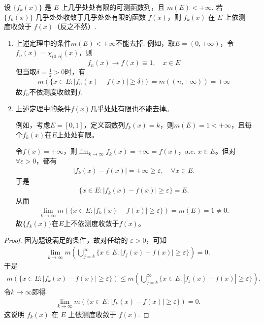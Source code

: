 \documentclass[../../main.tex]{subfiles}%
\begin{document}
\begin{theorem}[Lebesgue定理]\label{theorem:几乎处处收敛在E的测度有限前提下必依测度收敛}
设 $\{f_k(x)\}$ 是 $E$ 上几乎处处有限的可测函数列，且 $m(E)<+\infty$. 若 $\{f_k(x)\}$ 几乎处处收敛于几乎处处有限的函数 $f(x)$，则 $f_k(x)$ 在 $E$ 上依测度收敛于 $f(x)$（反之不然）.
\end{theorem}
\begin{remark}
\begin{enumerate}
\item 上述定理中的条件\(m(E) < +\infty\)不能去掉. 例如，取\(E = (0, +\infty)\)，令\(f_n(x) = \chi_{(0,n]}(x)\)，则
\[f_n(x) \to f(x) \equiv 1, \quad x \in E\]
但当取\(\delta = \frac{1}{2} > 0\)时，有
\begin{align*}
m(\{x \in E : |f_n(x) - f(x)| \geqslant \delta\}) = m((n, +\infty)) = +\infty
\end{align*}
故\(f_n\)不依测度收敛到\(f\). 

\item 上述定理中的条件\(f(x)\)几乎处处有限也不能去掉。

例如，考虑\(E = [0, 1]\)，定义函数列\(f_k(x) = k\)，则\(m(E) = 1 < +\infty\)，且每个\(f_k(x)\)在\(E\)上处处有限。

令\(f(x) = +\infty\)，则\(\lim_{k \to \infty} f_k(x) = +\infty = f(x)\)，a.e. \(x \in E\)。但对\(\forall \varepsilon > 0\)，都有
\begin{align*}
|f_k(x) - f(x)| = +\infty \geqslant \varepsilon, \quad \forall x \in E.
\end{align*}
于是
\begin{align*}
\{x \in E : |f_k(x) - f(x)| \geqslant \varepsilon\} = E.
\end{align*}
从而
\begin{align*}
\lim_{k \to \infty} m(\{x \in E : |f_k(x) - f(x)| \geqslant \varepsilon\}) = m(E) = 1 \ne 0.
\end{align*}
故\(\{f_k(x)\}\)在\(E\)上不依测度收敛于\(f(x)\)。
\end{enumerate}
\end{remark}
\begin{proof}

因为题设满足的条件，故对任给的 $\varepsilon>0$，可知
\begin{align*}
\lim_{k\to\infty}m\left(\bigcup_{j = k}^{\infty}\{x\in E:\vert f_j(x)-f(x)\vert\geqslant\varepsilon\}\right)=0.
\end{align*}
于是
\begin{align*}
m(\{x\in E:\left| f_k(x)-f(x) \right|\geqslant \varepsilon \})\leqslant m\left( \bigcup_{j=k}^{\infty}{\{x}\in E:\left| f_j(x)-f(x) \right|\geqslant \varepsilon \} \right) .
\end{align*}
令$k\to \infty$即得
\begin{align*}
\lim_{k\to\infty}m(\{x\in E:\vert f_k(x)-f(x)\vert\geqslant\varepsilon\}) = 0.
\end{align*}
这说明 $f_k(x)$ 在 $E$ 上依测度收敛于 $f(x)$.

\end{proof}
\end{document}
